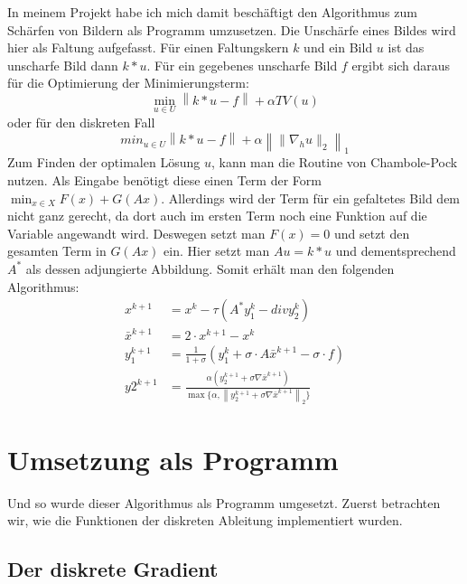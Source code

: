 \documentclass{article}
\theoremstyle{case}
\newcommand{\norm}[1]{\left\lVert#1\right\rVert}
\begin{document}
In meinem Projekt habe ich mich damit beschäftigt den Algorithmus zum Schärfen von Bildern als Programm umzusetzen. Die Unschärfe eines Bildes wird hier als Faltung aufgefasst. Für einen Faltungskern $k$ und ein Bild $u$ ist das unscharfe Bild dann $k*u$. Für ein gegebenes unscharfe Bild $f$ ergibt sich daraus für die Optimierung der Minimierungsterm:
\begin{equation}
\min_{u\in U}\norm{k*u - f} + \alpha TV(u)
\end{equation}
oder für den diskreten Fall
\begin{equation}
min_{u\in U}\norm{k*u - f} + \alpha \norm{\lVert \nabla_{h} u \rVert_{2}}_{1}
\end{equation}
Zum Finden der optimalen Lösung $u$, kann man die Routine von Chambole-Pock nutzen. Als Eingabe benötigt diese einen Term der Form $\min_{x\in X} F(x) + G(Ax)$. Allerdings wird der Term für ein gefaltetes Bild dem nicht ganz gerecht, da dort auch im ersten Term noch eine Funktion auf die Variable angewandt wird. Deswegen setzt man $F(x) = 0$ und setzt den gesamten Term in $G(Ax)$ ein. Hier setzt man $Au = k*u$ und dementsprechend $A^{*}$ als dessen adjungierte Abbildung. Somit erhält man den folgenden Algorithmus:
\begin{align*}
x^{k+1} &= x^{k} - \tau (A^{*}y_{1}^{k} - div y_{2}^{k}) \\
\bar{x}^{k+1} &= 2\cdot x^{k+1} - x^{k} \\
y_{1}^{k+1} &= \frac{1}{1+\sigma} (y_{1}^{k} + \sigma\cdot A \bar{x}^{k+1} - \sigma\cdot f) \\
y{2}^{k+1} &= \frac{\alpha (y_{2}^{k+1} + \sigma \nabla \bar{x}^{k+1} )}{\max\{\alpha, \norm{y_{2}^{k+1} + \sigma \nabla \bar{x}^{k+1} }_{2}\}}
\end{align*}


\section{Umsetzung als Programm}
Und so wurde dieser Algorithmus als Programm umgesetzt.\newline
Zuerst betrachten wir, wie die Funktionen der diskreten Ableitung implementiert wurden.

\subsection{Der diskrete Gradient}
\end{document}
